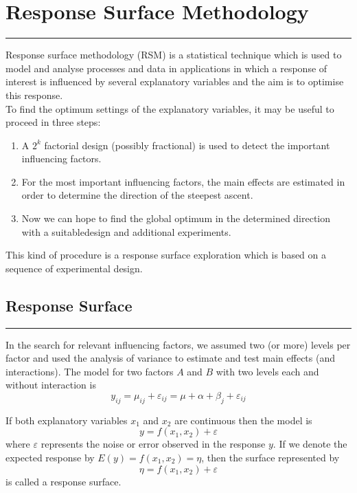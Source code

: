 \section{Response Surface Methodology}
\noindent\rule[\linienAbstand]{\linewidth}{\linienDickeDick}

Response surface methodology (RSM) is a statistical technique which is used to model and analyse processes and data in applications in which a response of interest is influenced by several explanatory variables and the aim is to optimise this response.\\
To find the optimum settings of the explanatory variables, it may be useful to proceed in three steps:
\begin{enumerate}
  \item A $2^k$ factorial design (possibly fractional) is used to detect the important influencing factors.
  \item For the most important influencing factors, the main effects are estimated in order to determine the direction of the steepest ascent.
  \item Now we can hope to find the global optimum in the determined direction with a suitabledesign and additional experiments.
\end{enumerate}
This kind of procedure is a response surface exploration which is based on a sequence of experimental design.


\subsection{Response Surface}
\noindent\rule[\linienAbstand]{\linewidth}{\linienDicke}
In the search for relevant influencing factors, we assumed two (or more) levels per factor and used the analysis of variance to estimate and test main effects (and interactions). The model for two factors $A$ and $B$ with two levels each and without interaction is
\begin{equation}
  y_{ij} = \mu_{ij} + \varepsilon_{ij} = \mu + \alpha + \beta_j + \varepsilon_{ij}
\end{equation}

If both explanatory variables $x_1$ and $x_2$ are continuous then the model is
\begin{equation}
  y = f(x_1, x_2) + \varepsilon
\end{equation}
where $\varepsilon$ represents the noise or error observed in the response $y$.
If we denote the expected response by $E(y) = f(x_1, x_2) = \eta$, then the surface represented by
\begin{equation}
  \eta = f(x_1, x_2) + \varepsilon
\end{equation}
is called a response surface.\\

